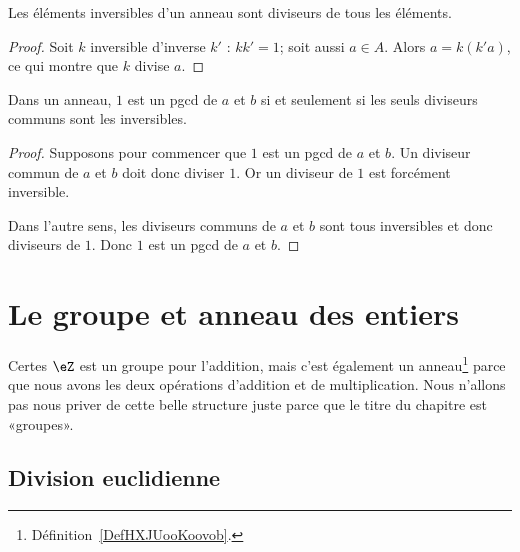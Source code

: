 \begin{lemma}
    Les éléments inversibles d'un anneau sont diviseurs de tous les éléments.
\end{lemma}

\begin{proof}
    Soit \( k\) inversible d'inverse \( k'\) : \( kk'=1\); soit aussi \( a\in A\). Alors \( a=k(k'a)\), ce qui montre que \( k\) divise \( a\).
\end{proof}

\begin{lemma}
    Dans un anneau, \( 1\) est un pgcd de \( a\) et \( b\) si et seulement si les seuls diviseurs communs sont les inversibles.
\end{lemma}

\begin{proof}
    Supposons pour commencer que \( 1\) est un pgcd de \( a\) et \( b\). Un diviseur commun de \( a\) et \( b\) doit donc diviser \( 1\). Or un diviseur de \( 1\) est forcément inversible.

    Dans l'autre sens, les diviseurs communs de \( a\) et \( b\) sont tous inversibles et donc diviseurs de \( 1\). Donc \( 1\) est un pgcd de \( a\) et \( b\).
\end{proof}

\section{Le groupe et anneau des entiers}

Certes \( \eZ\) est un groupe pour l'addition, mais c'est également un anneau\footnote{Définition~\ref{DefHXJUooKoovob}.} parce que nous avons les deux opérations d'addition et de multiplication. Nous n'allons pas nous priver de cette belle structure juste parce que le titre du chapitre est «groupes».

\subsection{Division euclidienne}

